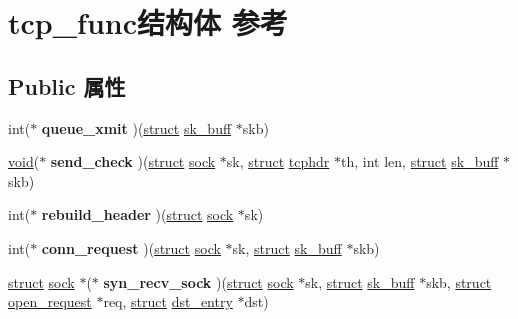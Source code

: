 \hypertarget{structtcp__func}{}\section{tcp\+\_\+func结构体 参考}
\label{structtcp__func}
\subsection*{Public 属性}
\begin{DoxyCompactItemize}
\item 
\mbox{\label{structtcp__func_a274915b71a64a66220085e3f21ef4806}} 
int($\ast$ {\bfseries queue\+\_\+xmit} )(\hyperlink{interfacestruct}{struct} \hyperlink{structsk__buff}{sk\+\_\+buff} $\ast$skb)
\item 
\mbox{\label{structtcp__func_a0332908641313ae1cb9cea571434ad7b}} 
\hyperlink{interfacevoid}{void}($\ast$ {\bfseries send\+\_\+check} )(\hyperlink{interfacestruct}{struct} \hyperlink{structsock}{sock} $\ast$sk, \hyperlink{interfacestruct}{struct} \hyperlink{structtcphdr}{tcphdr} $\ast$th, int len, \hyperlink{interfacestruct}{struct} \hyperlink{structsk__buff}{sk\+\_\+buff} $\ast$skb)
\item 
\mbox{\label{structtcp__func_a7603c1829ae2fbdda4692efef91c5e4b}} 
int($\ast$ {\bfseries rebuild\+\_\+header} )(\hyperlink{interfacestruct}{struct} \hyperlink{structsock}{sock} $\ast$sk)
\item 
\mbox{\label{structtcp__func_a05bdbbd10ee425cae19cead48ebc2d29}} 
int($\ast$ {\bfseries conn\+\_\+request} )(\hyperlink{interfacestruct}{struct} \hyperlink{structsock}{sock} $\ast$sk, \hyperlink{interfacestruct}{struct} \hyperlink{structsk__buff}{sk\+\_\+buff} $\ast$skb)
\item 
\mbox{\label{structtcp__func_a224e27f0f84bf0d79e6ea4660e4db1f6}} 
\hyperlink{interfacestruct}{struct} \hyperlink{structsock}{sock} $\ast$($\ast$ {\bfseries syn\+\_\+recv\+\_\+sock} )(\hyperlink{interfacestruct}{struct} \hyperlink{structsock}{sock} $\ast$sk, \hyperlink{interfacestruct}{struct} \hyperlink{structsk__buff}{sk\+\_\+buff} $\ast$skb, \hyperlink{interfacestruct}{struct} \hyperlink{structopen__request}{open\+\_\+request} $\ast$req, \hyperlink{interfacestruct}{struct} \hyperlink{structdst__entry}{dst\+\_\+entry} $\ast$dst)

\end{DoxyCompactItemize}
